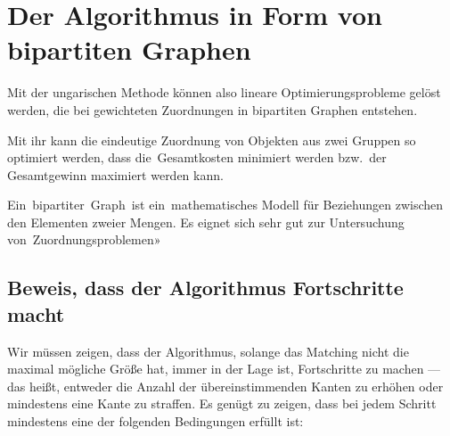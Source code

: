 %
%
%
\section{Der Algorithmus in Form von bipartiten Graphen
\label{munkres:section:teil3}}
Mit der ungarischen Methode können also lineare Optimierungsprobleme
gelöst werden, die bei gewichteten Zuordnungen in bipartiten Graphen
entstehen.

Mit ihr kann die eindeutige Zuordnung von Objekten aus zwei Gruppen
so optimiert werden, dass die Gesamtkosten minimiert werden bzw.~der
Gesamtgewinn maximiert werden kann.

Ein bipartiter Graph ist ein mathematisches Modell für Beziehungen
zwischen den Elementen zweier Mengen.
Es eignet sich sehr gut zur Untersuchung von Zuordnungsproblemen» 

\subsection{Beweis, dass der Algorithmus Fortschritte macht
\label{munkres:subsection:malorum}}
Wir müssen zeigen, dass der Algorithmus, solange das Matching nicht
die maximal mögliche Größe hat, immer in der Lage ist, Fortschritte
zu machen --- das heißt, entweder die Anzahl der übereinstimmenden
Kanten zu erhöhen oder mindestens eine Kante zu straffen.
Es genügt zu zeigen, dass bei jedem Schritt mindestens eine der
folgenden Bedingungen erfüllt ist:

